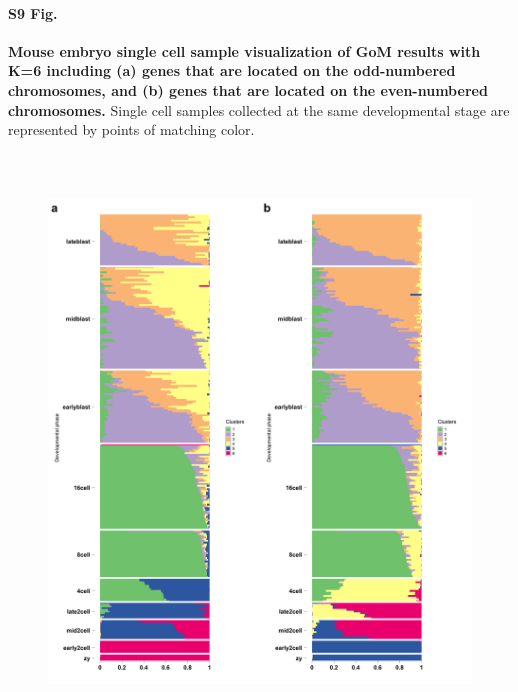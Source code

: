 \documentclass[10pt,letterpaper]{article}
\begin{document}
\paragraph*{S9 Fig.}

\label{figS9}
{\bf Mouse embryo single cell sample visualization of GoM results with K=6 including
(a) genes that are located on the odd-numbered chromosomes,
and (b) genes that are located on the even-numbered chromosomes.}
Single cell samples collected at the same developmental stage are represented by points of matching color.
\begin{figure}[ht]
\centering
\includegraphics[height=6in, width=5in]{../../src/figure/deng-chromosome.Rmd/deng-chromosome-plot-1.png}
\end{figure}
\end{document}
